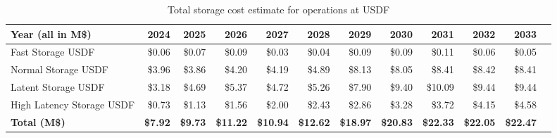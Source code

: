 \tiny \begin{longtable} { |p{}  |r  |r  |r  |r  |r  |r  |r  |r  |r  |r  |r |} 
\caption{Total storage cost estimate for operations at USDF \label{tab:opsStorageUSDF}}\\ 
\hline 
\textbf{Year (all in M\$)}&\textbf{2024}&\textbf{2025}&\textbf{2026}&\textbf{2027}&\textbf{2028}&\textbf{2029}&\textbf{2030}&\textbf{2031}&\textbf{2032}&\textbf{2033} \\ \hline
{Fast Storage USDF}&{\$0.06}&{\$0.07}&{\$0.09}&{\$0.03}&{\$0.04}&{\$0.09}&{\$0.09}&{\$0.11}&{\$0.06}&{\$0.05} \\ \hline
{Normal Storage USDF}&{\$3.96}&{\$3.86}&{\$4.20}&{\$4.19}&{\$4.89}&{\$8.13}&{\$8.05}&{\$8.41}&{\$8.42}&{\$8.41} \\ \hline
{Latent Storage USDF}&{\$3.18}&{\$4.69}&{\$5.37}&{\$4.72}&{\$5.26}&{\$7.90}&{\$9.40}&{\$10.09}&{\$9.44}&{\$9.44} \\ \hline
{High Latency Storage USDF}&{\$0.73}&{\$1.13}&{\$1.56}&{\$2.00}&{\$2.43}&{\$2.86}&{\$3.28}&{\$3.72}&{\$4.15}&{\$4.58} \\ \hline
\textbf{Total (M\$)}&\textbf{\$7.92}&\textbf{\$9.73}&\textbf{\$11.22}&\textbf{\$10.94}&\textbf{\$12.62}&\textbf{\$18.97}&\textbf{\$20.83}&\textbf{\$22.33}&\textbf{\$22.05}&\textbf{\$22.47} \\ \hline
\end{longtable} \normalsize
